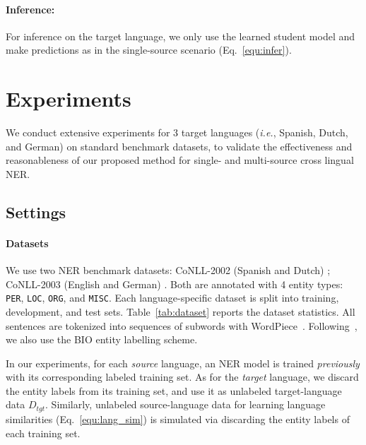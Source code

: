 \documentclass[11pt,a4paper]{article}
\newcommand\ie{\textit{i.e.}}
\begin{document}
	\paragraph{Inference: } For inference on the target language, we only use the learned student model and make predictions as in the single-source scenario (Eq.~\ref{equ:infer}).
	
	
	
	\section{Experiments}
	\label{sec:expt}
	We conduct extensive experiments for 3 target languages (\ie, Spanish, Dutch, and German) on standard benchmark datasets, to validate the effectiveness and reasonableness of our proposed method for single- and multi-source cross lingual NER. 

	\subsection{Settings}
	\paragraph{Datasets}
	We use two NER benchmark datasets: CoNLL-2002 (Spanish and Dutch) \cite{tjong2002introduction}; CoNLL-2003 (English and German) \cite{tjong2003introduction}. 
	Both are annotated with 4 entity types: \texttt{PER}, \texttt{LOC}, \texttt{ORG}, and \texttt{MISC}. 
	Each language-specific dataset is split into training, development, and test sets. 
	Table~\ref{tab:dataset} reports the dataset statistics. 
	All sentences are tokenized into sequences of subwords with WordPiece~\cite{wu2016google}. Following~\citet{wu2019beto}, we also use the BIO entity labelling scheme. 
	
	In our experiments, for each \textit{source} language, an NER model is trained \textit{previously} with its corresponding labeled training set. As for the \textit{target} language, we discard the entity labels from its training set, and use it as unlabeled target-language data $D_{tgt}$. Similarly, unlabeled source-language data for learning language similarities (Eq.~\ref{equ:lang_sim}) is simulated via discarding the entity labels of each training set.
	
\end{document}
